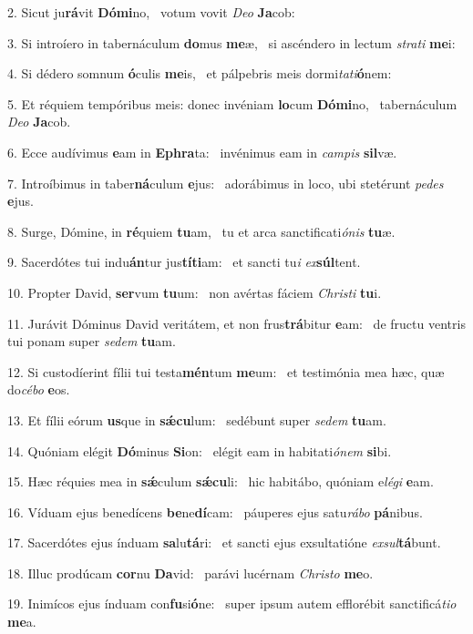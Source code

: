 2. Sicut ju\textbf{rá}vit \textbf{Dó}\textbf{mi}no, \ast\  votum vovit \textit{De}\textit{o} \textbf{Ja}cob:\

3. Si introíero in tabernáculum \textbf{do}mus \textbf{me}æ, \ast\  si ascéndero in lectum \textit{stra}\textit{ti} \textbf{me}i:\

4. Si dédero somnum \textbf{ó}culis \textbf{me}is, \ast\  et pálpebris meis dormi\textit{ta}\textit{ti}\textbf{ó}nem:\

5. Et réquiem tempóribus meis: donec invéniam \textbf{lo}cum \textbf{Dó}\textbf{mi}no, \ast\  tabernáculum \textit{De}\textit{o} \textbf{Ja}cob.\

6. Ecce audívimus \textbf{e}am in \textbf{E}\textbf{phra}ta: \ast\  invénimus eam in \textit{cam}\textit{pis} \textbf{sil}væ.\

7. Introíbimus in taber\textbf{ná}culum \textbf{e}jus: \ast\  adorábimus in loco, ubi stetérunt \textit{pe}\textit{des} \textbf{e}jus.\

8. Surge, Dómine, in \textbf{ré}quiem \textbf{tu}am, \ast\  tu et arca sanctificati\textit{ó}\textit{nis} \textbf{tu}æ.\

9. Sacerdótes tui indu\textbf{án}tur jus\textbf{tí}\textbf{ti}am: \ast\  et sancti tu\textit{i} \textit{ex}\textbf{súl}tent.\

10. Propter David, \textbf{ser}vum \textbf{tu}um: \ast\  non avértas fáciem \textit{Chris}\textit{ti} \textbf{tu}i.\

11. Jurávit Dóminus David veritátem, et non frus\textbf{trá}bitur \textbf{e}am: \ast\  de fructu ventris tui ponam super \textit{se}\textit{dem} \textbf{tu}am.\

12. Si custodíerint fílii tui testa\textbf{mén}tum \textbf{me}um: \ast\  et testimónia mea hæc, quæ do\textit{cé}\textit{bo} \textbf{e}os.\

13. Et fílii eórum \textbf{us}que in \textbf{sǽ}\textbf{cu}lum: \ast\  sedébunt super \textit{se}\textit{dem} \textbf{tu}am.\

14. Quóniam elégit \textbf{Dó}minus \textbf{Si}on: \ast\  elégit eam in habitati\textit{ó}\textit{nem} \textbf{si}bi.\

15. Hæc réquies mea in \textbf{sǽ}culum \textbf{sǽ}\textbf{cu}li: \ast\  hic habitábo, quóniam e\textit{lé}\textit{gi} \textbf{e}am.\

16. Víduam ejus benedícens \textbf{be}ne\textbf{dí}cam: \ast\  páuperes ejus satu\textit{rá}\textit{bo} \textbf{pá}nibus.\

17. Sacerdótes ejus índuam \textbf{sa}lu\textbf{tá}ri: \ast\  et sancti ejus exsultatióne \textit{ex}\textit{sul}\textbf{tá}bunt.\

18. Illuc prodúcam \textbf{cor}nu \textbf{Da}vid: \ast\  parávi lucérnam \textit{Chris}\textit{to} \textbf{me}o.\

19. Inimícos ejus índuam con\textbf{fu}si\textbf{ó}ne: \ast\  super ipsum autem efflorébit sanctificá\textit{ti}\textit{o} \textbf{me}a.\

